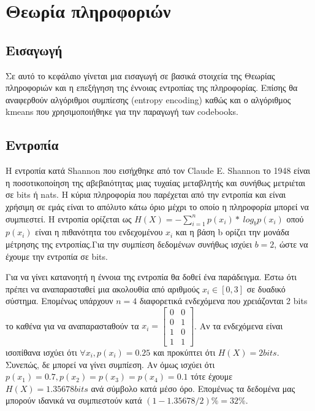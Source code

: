 ﻿\chapter{Θεωρία πληροφοριών}
\label{chapter:chap3}

\section{Εισαγωγή}
\label{section:sect31}

\indent Σε αυτό το κεφάλαιο γίνεται μια εισαγωγή σε βασικά στοιχεία της Θεωρίας πληροφοριών και η επεξήγηση της έννοιας εντροπίας της πληροφορίας. Επίσης θα αναφερθούν αλγόριθμοι συμπίεσης (entropy encoding) καθώς και ο αλγόριθμος kmeans που χρησιμοποιήθηκε για την παραγωγή των codebooks.

\section{Εντροπία}
\label{section:sect32}

\indent Η εντροπία κατά Shannon που εισήχθηκε από τον Claude E. Shannon το 1948 είναι η ποσοτικοποίηση της αβεβαιότητας μιας τυχαίας μεταβλητής και συνήθως μετριέται σε bits ή nats. Η κύρια πληροφορία που παρέχεται από την εντροπία και είναι χρήσιμη σε εμάς είναι το απόλυτο κάτω όριο μέχρι το οποίο η πληροφορία μπορεί να συμπιεστεί. Η εντροπία ορίζεται ως $ H(X) = -\sum_{i=1}^{n} p(x_i)*\ log_{b} p(x_i) $  οπού $p(x_i)$ είναι η πιθανότητα του ενδεχομένου $x_i$ και η βάση b ορίζει την μονάδα μέτρησης της εντροπίας.Για την συμπίεση δεδομένων συνήθως ισχύει $b=2$, ώστε να έχουμε την εντροπία σε bits.

\indent Για να γίνει κατανοητή η έννοια της εντροπία θα δοθεί ένα παράδειγμα. Έστω ότι πρέπει να αναπαρασταθεί μια ακολουθία από αριθμούς $x_i \in [0,3] $ σε δυαδικό σύστημα. Επομένως υπάρχουν $n=4$ διαφορετικά ενδεχόμενα που χρειάζονται 2 bits το καθένα για να αναπαρασταθούν τα
$x_i = \begin{bmatrix}
0 & 0 \\
0 & 1 \\
1 & 0 \\
1 & 1
\end{bmatrix} $. Αν τα ενδεχόμενα είναι ισοπίθανα ισχύει ότι $ \forall{x_i}, p(x_i)= 0.25 $ και προκύπτει ότι $ H(X) = 2bits $. Συνεπώς, δε μπορεί να γίνει συμπίεση. Αν όμως ισχύει ότι $ p(x_1) = 0.7, p(x_2)=p(x_3)=p(x_4)=0.1 $ τότε έχουμε $ H(X) = 1.35678 bits$ ανά σύμβολο κατά μέσο όρο. Επομένως τα δεδομένα μας μπορούν ιδανικά να συμπιεστούν κατά $(1-1.35678/2)\% = 32\%$.

